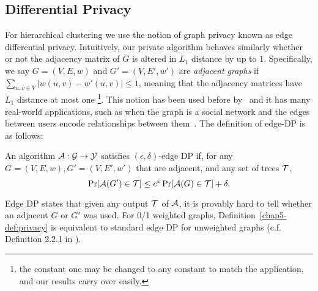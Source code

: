 \subsection{Differential Privacy}
For hierarchical clustering we use the notion of graph privacy known as edge differential privacy. Intuitively, our private algorithm behaves similarly whether or not the adjacency matrix of $G$ is altered in $L_1$ distance by up to $1$. Specifically, we say $G = (V, E, w)$ and $G' = (V, E', w')$ are \emph{adjacent graphs} if $\sum_{u,v \in V} |w(u,v) - w'(u,v)| \leq 1$, meaning that the adjacency matrices have $L_1$ distance at most one \footnote{the constant one may be changed to any constant to match the application, and our results carry over easily.}. This notion has been used before by~\citet{ eliavs2020differentially, blocki2012johnson} and it has many real-world applications, such as when the graph is a social network and the edges between users encode relationships between them~\citep{epasto2022differentially}.
The definition of edge-DP is as follows:
\begin{defn}\label{chap5-def:privacy}
An algorithm $\mathcal{A} : \mathcal{G} \rightarrow \mathcal{Y}$ satisfies $(\epsilon, \delta)$-edge DP if, for any $G = (V,E,w), G' = (V,E',w')$ that are adjacent, and any set of trees $\mathcal{T}$,
\[
    \Pr[\mathcal{A}(G') \in \mathcal{T} ] \leq e^\varepsilon \Pr[\mathcal{A}(G) \in \mathcal{T}] + \delta.
\]
\end{defn}
Edge DP states that given any output $\mathcal{T}$ of $\mathcal{A}$, it is provably hard to tell whether an adjacent $G$ or $G'$ was used.
For 0/1 weighted graphs, Definition~\ref{chap5-def:privacy} is equivalent to standard edge DP for unweighted graphs (c.f. Definition 2.2.1 in \cite{pinot2018minimum}).
